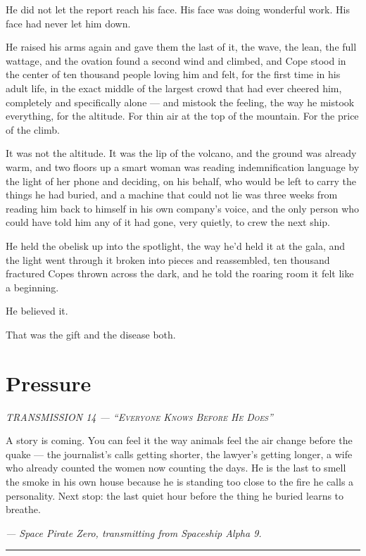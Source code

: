 \documentclass[11pt,openany]{book}
\newcommand{\transheader}{\normalfont\footnotesize\scshape\letterspace}
\newcommand{\letterspace}{}
\newenvironment{transmission}{%
  \par\vspace{0.3\baselineskip}\begin{center}\begin{minipage}{0.88\textwidth}%
  \itshape\small\setlength{\parindent}{0pt}\setstretch{1.06}}%
  {\end{minipage}\end{center}\vspace{0.4\baselineskip}%
  \noindent\hfil\rule{0.35\textwidth}{0.3pt}\hfil\par\vspace{1.0\baselineskip}}
\begin{document}
He did not let the report reach his face. His face was doing wonderful work. His face had never let him down.

He raised his arms again and gave them the last of it, the wave, the lean, the full wattage, and the ovation found a second wind and climbed, and Cope stood in the center of ten thousand people loving him and felt, for the first time in his adult life, in the exact middle of the largest crowd that had ever cheered him, completely and specifically alone --- and mistook the feeling, the way he mistook everything, for the altitude. For thin air at the top of the mountain. For the price of the climb.

It was not the altitude. It was the lip of the volcano, and the ground was already warm, and two floors up a smart woman was reading indemnification language by the light of her phone and deciding, on his behalf, who would be left to carry the things he had buried, and a machine that could not lie was three weeks from reading him back to himself in his own company's voice, and the only person who could have told him any of it had gone, very quietly, to crew the next ship.

He held the obelisk up into the spotlight, the way he'd held it at the gala, and the light went through it broken into pieces and reassembled, ten thousand fractured Copes thrown across the dark, and he told the roaring room it felt like a beginning.

He believed it.

That was the gift and the disease both.

\clearpage
\chapter{Pressure}

\begin{transmission}
{\transheader TRANSMISSION 14 --- ``Everyone Knows Before He Does''}\par\vspace{0.5em}
A story is coming. You can feel it the way animals feel the air change before the quake --- the journalist's calls getting shorter, the lawyer's getting longer, a wife who already counted the women now counting the days. He is the last to smell the smoke in his own house because he is standing too close to the fire he calls a personality. Next stop: the last quiet hour before the thing he buried learns to breathe.\par
\vspace{0.5em}\hfill\textit{--- Space Pirate Zero, transmitting from Spaceship Alpha 9.}\par
\end{transmission}
\end{document}
